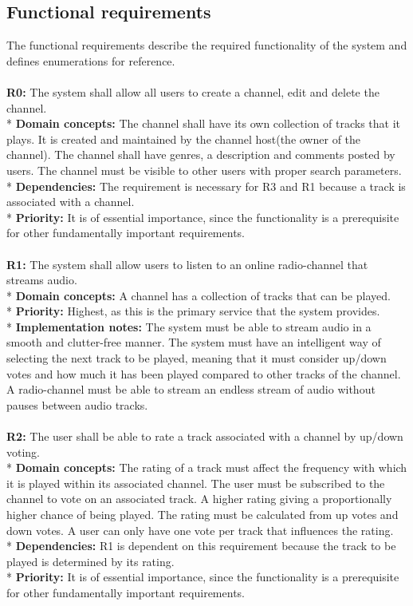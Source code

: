 \documentclass[a4paper,11pt,report]{article}
\begin{document}
\subsection{Functional requirements}
The functional requirements describe the required functionality of the system and defines enumerations for reference.
\\ \\
\textbf{R0:}
The system shall allow all users to create a channel, edit and delete the channel. \\*
\textbf{Domain concepts:}
The channel shall have its own collection of tracks that it plays. It is created and maintained by the channel host(the owner of the channel).
The channel shall have genres, a description and comments posted by users.
The channel must be visible to other users with proper search parameters. \\*
\textbf{Dependencies:} 
The requirement is necessary for R3 and R1 because a track is associated with a channel. \\*
\textbf{Priority:} 
It is of essential importance, since the functionality is a prerequisite for other fundamentally important requirements.
\\ \\

\textbf{R1:}
The system shall allow users to listen to an online radio-channel that streams audio. \\*
\textbf{Domain concepts:}
A channel has a collection of tracks that can be played. \\*
\textbf{Priority:}
Highest, as this is the primary service that the system provides. \\*
\textbf{Implementation notes:}
The system must be able to stream audio in a smooth and clutter-free manner. The system must have an intelligent way of selecting the next track to be played, meaning that it must consider up/down votes and how much it has been played compared to other tracks of the channel.
A radio-channel must be able to stream an endless stream of audio without pauses between audio tracks.
\\ \\

\textbf{R2:}
The user shall be able to rate a track associated with a channel by up/down voting. \\*
\textbf{Domain concepts:}
The rating of a track must affect the frequency with which it is played within its associated channel. The user must be subscribed to the channel to vote on an associated track.
A higher rating giving a proportionally higher chance of being played. The rating must be calculated from up votes and down votes. A user can only have one vote per track that influences the rating. \\*
\textbf{Dependencies:}
R1 is dependent on this requirement because the track to be played is determined by its rating.\\*
\textbf{Priority:}
It is of essential importance, since the functionality is a prerequisite for other fundamentally important requirements.
\\ \\
\end{document}
